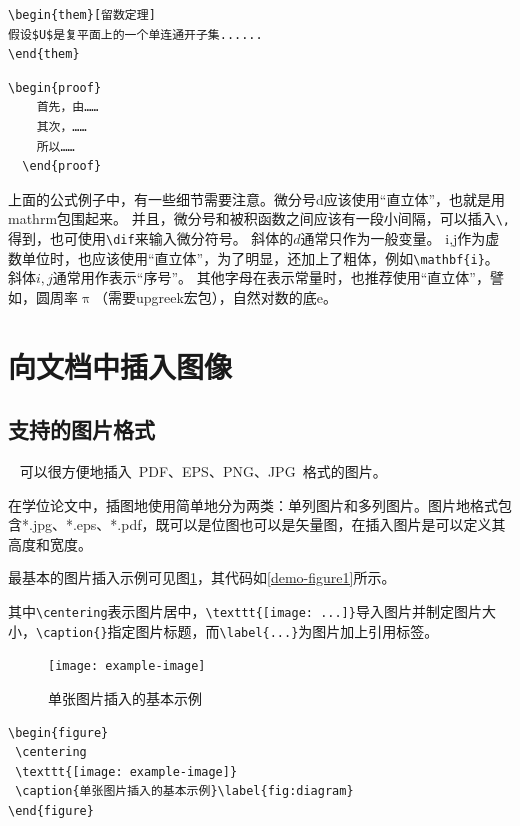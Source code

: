\begin{lstlisting}[language={[LaTeX]TeX}, caption={定理环境}]
\begin{them}[留数定理]
假设$U$是复平面上的一个单连通开子集...... 
\end{them}
\end{lstlisting}

\begin{lstlisting}[language={[LaTeX]TeX}, caption={证明环境}]
  \begin{proof}
    首先，由……
    其次，……
    所以……
  \end{proof}
\end{lstlisting}

上面的公式例子中，有一些细节需要注意。微分号d应该使用``直立体''，也就是用mathrm包围起来。
并且，微分号和被积函数之间应该有一段小间隔，可以插入\verb+\,+得到，也可使用\verb+\dif+来输入微分符号。
斜体的$d$通常只作为一般变量。
i,j作为虚数单位时，也应该使用``直立体''，为了明显，还加上了粗体，例如\verb+\mathbf{i}+。斜体$i,j$通常用作表示``序号''。
其他字母在表示常量时，也推荐使用``直立体''，譬如，圆周率$\uppi$（需要upgreek宏包），自然对数的底$\mathrm{e}$。


\section{向文档中插入图像}
\label{sec:insertimage}

\subsection{支持的图片格式}
\label{sec:imageformat}

\XeTeX~ 可以很方便地插入~PDF、EPS、PNG、JPG~格式的图片。

在学位论文中，插图地使用简单地分为两类：单列图片和多列图片。图片地格式包含*.jpg、*.eps、*.pdf，既可以是位图也可以是矢量图，在插入图片是可以定义其高度和宽度。

最基本的图片插入示例可见图\ref{fig:diagram}，其代码如\ref{demo-figure1}所示。

其中\verb+\centering+表示图片居中，\verb+\texttt{[image: ...]}+导入图片并制定图片大小，\verb+\caption{}+指定图片标题，而\verb+\label{...}+为图片加上引用标签。

\begin{figure}
 \centering
 \texttt{[image: example-image]}
 \caption{单张图片插入的基本示例}\label{fig:diagram}
\end{figure}

\begin{lstlisting}[language={[LaTeX]TeX}, caption={示例插图代码}, label=demo-figure1]
\begin{figure}
 \centering
 \texttt{[image: example-image]}
 \caption{单张图片插入的基本示例}\label{fig:diagram}
\end{figure}
\end{lstlisting}

